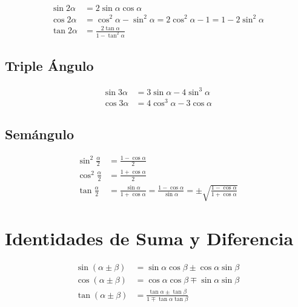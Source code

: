 \documentclass[12pt,a4paper]{article}
\begin{document}
\begin{tcolorbox}[formulabox, title={Doble ángulo}]
\begin{align*}
\sin 2\alpha &= 2\sin\alpha\cos\alpha \\[4pt]
\cos 2\alpha &= \cos^2\alpha - \sin^2\alpha
             = 2\cos^2\alpha - 1
             = 1 - 2\sin^2\alpha \\[4pt]
\tan 2\alpha &= \frac{2\tan\alpha}{1-\tan^2\alpha}
\end{align*}
\end{tcolorbox}

\subsection{Triple Ángulo}

\begin{tcolorbox}[formulabox, title={Triple ángulo}]
\begin{align*}
\sin 3\alpha &= 3\sin\alpha - 4\sin^3\alpha \\[4pt]
\cos 3\alpha &= 4\cos^3\alpha - 3\cos\alpha
\end{align*}
\end{tcolorbox}

\subsection{Semángulo}

\begin{tcolorbox}[formulabox, title={Mitad de ángulo}]
\begin{align*}
\sin^2\frac{\alpha}{2} &= \frac{1-\cos\alpha}{2} \\[8pt]
\cos^2\frac{\alpha}{2} &= \frac{1+\cos\alpha}{2} \\[8pt]
\tan\frac{\alpha}{2}   &= \frac{\sin\alpha}{1+\cos\alpha}
                        = \frac{1-\cos\alpha}{\sin\alpha}
                        = \pm\sqrt{\frac{1-\cos\alpha}{1+\cos\alpha}}
\end{align*}
\end{tcolorbox}

\section{Identidades de Suma y Diferencia}

\begin{tcolorbox}[formulabox, title={Suma y diferencia de ángulos}]
\begin{align*}
\sin(\alpha\pm\beta) &= \sin\alpha\cos\beta \pm \cos\alpha\sin\beta \\[6pt]
\cos(\alpha\pm\beta) &= \cos\alpha\cos\beta \mp \sin\alpha\sin\beta \\[6pt]
\tan(\alpha\pm\beta) &= \frac{\tan\alpha\pm\tan\beta}
                            {1\mp\tan\alpha\tan\beta}
\end{align*}
\end{tcolorbox}
\end{document}
